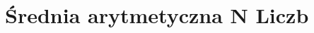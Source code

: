 \documentclass[a4paper,11pt]{article}
\begin{document}
\section{Średnia arytmetyczna N Liczb}
\begin{figure}[ht]
\centering
{}
\quad
{}
\end{figure}
\newpage
\end{document}

